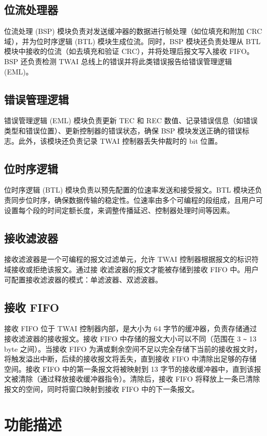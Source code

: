 \documentclass[main\_\_CN.tex]{subfiles}
\begin{document}
\subsection{位流处理器}
位流处理 (BSP) 模块负责对发送缓冲器的数据进行帧处理（如位填充和附加 CRC 域），并为位时序逻辑 (BTL) 模块生成位流。同时，BSP 模块还负责处理从 BTL 模块中接收的位流（如去填充和验证 CRC），并将处理后报文写入接收 FIFO。BSP 还负责检测 TWAI 总线上的错误并将此类错误报告给错误管理逻辑 (EML)。

\subsection{错误管理逻辑}
错误管理逻辑 (EML) 模块负责更新 TEC 和 REC 数值、记录错误信息（如错误类型和错误位置）、更新控制器的错误状态，确保 BSP 模块发送正确的错误标志。此外，该模块还负责记录 TWAI 控制器丢失仲裁时的 bit 位置。

\subsection{位时序逻辑}
位时序逻辑 (BTL) 模块负责以预先配置的位速率发送和接受报文。BTL 模块还负责同步位时序，确保数据传输的稳定性。位速率由多个可编程的段组成，且用户可设置每个段的时间定额长度，来调整传播延迟、控制器处理时间等因素。

\subsection{接收滤波器}
接收滤波器是一个可编程的报文过滤单元，允许 TWAI 控制器根据报文的标识符域接收或拒绝该报文。通过接
收滤波器的报文才能被存储到接收 FIFO 中。用户可配置接收滤波器的模式：单滤波器、双滤波器。

\subsection{接收 FIFO}
接收 FIFO 位于 TWAI 控制器内部，是大小为 64 字节的缓冲器，负责存储通过接收滤波器的接收报文。接收 FIFO 中存储的报文大小可以不同（范围在 3 \verb+~+ 13 byte 之间）。当接收 FIFO 为满或剩余空间不足以完全存储下当前的接收报文时，将触发溢出中断，后续的接收报文将丢失，直到接收 FIFO 中清除出足够的存储空间。接收 FIFO 中的第一条报文将被映射到 13 字节的接收缓冲器中，直到该报文被清除（通过释放接收缓冲器指令）。清除后，接收 FIFO 将释放上一条已清除报文的空间，同时将窗口映射到接收 FIFO 中的下一条报文。

\section{功能描述}
\end{document}
